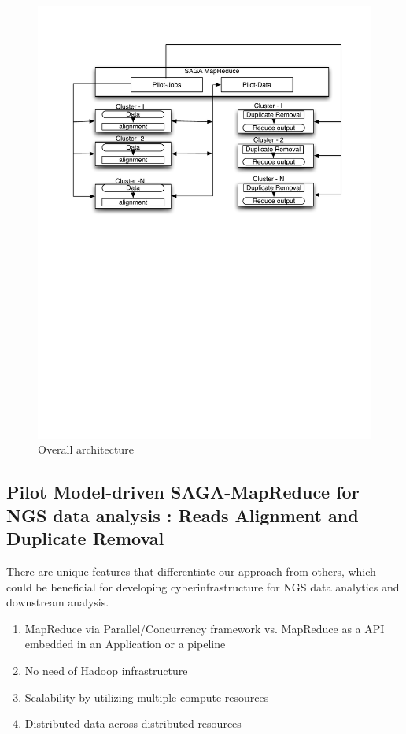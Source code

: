 \documentclass{sig-alternate}
\begin{document}
\begin{figure}
 \centering
\includegraphics[scale=0.45]{figures/align-dup.pdf} 

\caption{\small Overall architecture}
  \label{fig:arch-pj-saga-mr} 
\end{figure}


\subsection{Pilot Model-driven SAGA-MapReduce for NGS data analysis : Reads Alignment and Duplicate Removal}

There are unique features that differentiate our approach from others, which could be beneficial for developing cyberinfrastructure for NGS data analytics and downstream analysis.  
\begin{enumerate}

\item MapReduce via Parallel/Concurrency framework vs. MapReduce as a API embedded in an Application or a pipeline  
\item No need of Hadoop infrastructure
\item Scalability by utilizing multiple compute resources
\item Distributed data across distributed resources
\end{enumerate}
 
\end{document}
